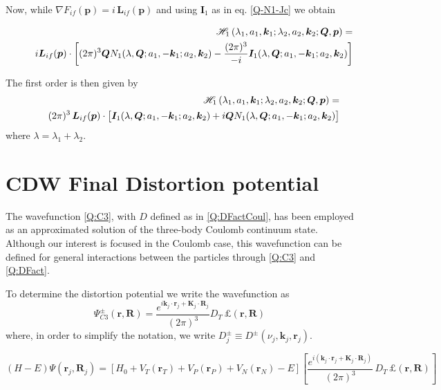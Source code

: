   \noindent
Now, while $\nabla F_{if} ({\bm{p}}) = i \, \bm{L}_{if}(\bm{p})$ and
using $\bm{I}_{1}$ as in eq. \ref{Q-N1-Jc} we obtain

\begin{eqnarray*}
&&\mathcal{H}_{1}\left( \lambda_{1},a_{1},\bm{k}_{1} ; \lambda_{2},
a_{2}, \bm{k}_{2}; \bm{Q}, \bm{p} \right)= \\
&&\qquad i \bm{L}_{if} ({\bm{p}})
\cdot \left[(2 \pi)^{3} \bm{Q} N_{1}(\lambda,\bm{Q} ; a_{1},-\bm{k}_{1}
; a_{2},\bm{k}_{2}) - \frac{(2 \pi)^{3}}{-i}
\bm{I}_{1}(\lambda,\bm{Q}; a_{1},-\bm{k}_{1}; a_{2},\bm{k}_{2} )
\vstretch \right]
\end{eqnarray*}

The first order is then given by
\begin{eqnarray}\label{Q:mathc-lambd-a_1}
&&\mathcal{H}_{1}\left( \lambda_{1},a_{1},\bm{k}_{1} ; \lambda_{2},
a_{2}, \bm{k}_{2}; \bm{Q}, \bm{p} \right)= \\
&& \qquad (2 \pi)^{3} \, \bm{L}_{if}
({\bm{p}}) \cdot  \left[ \bm{I}_{1}(\lambda,\bm{Q}; a_{1},-\bm{k}_{1};
a_{2},\bm{k}_{2} ) + i \bm{Q} N_{1}(\lambda,\bm{Q} ;
a_{1},-\bm{k}_{1} ; a_{2},\bm{k}_{2}) \vstretch \right] \nonumber
\end{eqnarray}
%
where $\lambda = \lambda_{1}+\lambda_{2}$.



\section{CDW Final Distortion potential}
The wavefunction \ref{Q:C3}, with $D$ defined as in \ref{Q:DFactCoul},
has been employed as an approximated solution of the three-body Coulomb
continuum state. Although our interest is focused in the Coulomb case,
this wavefunction can be defined for general interactions between the
particles through \ref{Q:C3} and \ref{Q:DFact}.

To determine the distortion potential we write the wavefunction as
\[
\Psi^{\pm}_{C3} (\bm{r},\bm{R}) = \frac{e^{i \bm{k}_j\cdot
\bm{r}_j+\bm{K}_j\cdot \bm{R}_j}}{(2 \pi)^3} D_{T} \,
\pounds(\bm{r},\bm{R})
\]
where, in order to simplify the notation, we write $D^{\pm}_{j} \equiv
D^{\pm}(\nu_j,\bm{k}_{j},\bm{r}_{j})$.

\begin{equation}\label{Q:C3-final-disto}
\left( H - E \right) \Psi(\bm{r}_{j}, \bm{R}_{j}) = \left[ H_{0} +
V_{T}(\bm{r}_{T}) + V_{P}(\bm{r}_{P}) + V_{N}(\bm{r}_{N}) - E \right]
\left[ \frac{e^{i (\bm{k}_j\cdot \bm{r}_j+\bm{K}_j \cdot
\bm{R}_j)}}{(2 \pi)^3} \, D_{T} \, \pounds(\bm{r},\bm{R}) \right]
\end{equation}

